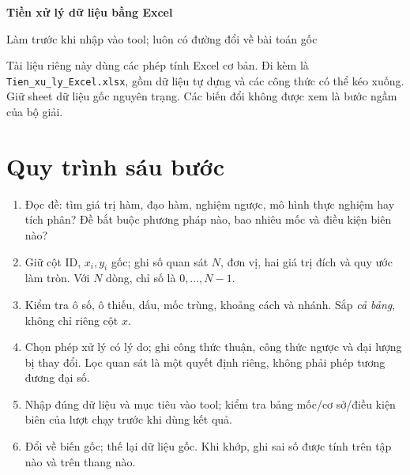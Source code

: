 \documentclass[11pt,a4paper]{article}
\begin{document}
\begin{center}
{\LARGE\bfseries Tiền xử lý dữ liệu bằng Excel}\par\medskip
{\large Làm trước khi nhập vào tool; luôn có đường đổi về bài toán gốc}
\end{center}
Tài liệu riêng này dùng các phép tính Excel cơ bản. Đi kèm là
\texttt{Tien\_xu\_ly\_Excel.xlsx}, gồm dữ liệu tự dựng và các công thức có thể kéo xuống.
Giữ sheet dữ liệu gốc nguyên trạng. Các biến đổi không được xem là bước ngầm của bộ giải.

\tableofcontents
\section{Quy trình sáu bước}
\begin{enumerate}
\item Đọc đề: tìm giá trị hàm, đạo hàm, nghiệm ngược, mô hình thực nghiệm hay tích phân? Đề bắt buộc phương pháp nào, bao nhiêu mốc và điều kiện biên nào?
\item Giữ cột ID, $x_i,y_i$ gốc; ghi số quan sát $N$, đơn vị, hai giá trị đích và quy ước làm tròn. Với $N$ dòng, chỉ số là $0,\ldots,N-1$.
\item Kiểm tra ô số, ô thiếu, dấu, mốc trùng, khoảng cách và nhánh. Sắp \emph{cả bảng}, không chỉ riêng cột $x$.
\item Chọn phép xử lý có lý do; ghi công thức thuận, công thức ngược và đại lượng bị thay đổi. Lọc quan sát là một quyết định riêng, không phải phép tương đương đại số.
\item Nhập đúng dữ liệu và mục tiêu vào tool; kiểm tra bảng mốc/cơ sở/điều kiện biên của lượt chạy trước khi dùng kết quả.
\item Đổi về biến gốc; thế lại dữ liệu gốc. Khi khớp, ghi sai số được tính trên tập nào và trên thang nào.
\end{enumerate}
\end{document}
